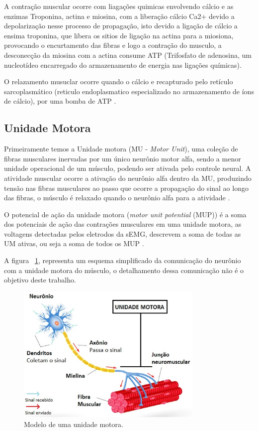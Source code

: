 A contração muscular ocorre com liagações quimicas envolvendo cálcio e as enzimas Troponina, actina e miosina, com a liberação cálcio Ca2+ devido a depolarização nesse processo de propagação, isto devido a ligação de cálcio a ensima troponina, que libera os sitios de ligação na actina para a miosiona, provocando o encurtamento das fibras e logo a contração do musculo, a desconecção da miosina com a actina consume ATP (Trifosfato de adenosina, um nucleotídeo encarregado do armazenamento de energia nas ligações químicas)\cite{da2005detecccao}. 

O relazamento musuclar ocorre quando o cálcio e recapturado pelo retículo sarcoplasmático (reticulo endoplasmatico especializado no armazenamento de íons de cálcio), por uma bomba de ATP \cite{da2005detecccao}. 

\subsection{Unidade Motora}
Primeiramente temos a Unidade motora (MU - \textit{Motor Unit}), uma coleção de fibras musculares inervadas por um único neurônio motor alfa, sendo a menor unidade operacional de um músculo, podendo ser ativada pelo controle neural. A atividade muscular ocorre a ativação do neurônio alfa dentro da MU, produzindo tensão nas fibras musculares ao passo que ocorre a propagação do sinal ao longo das fibras, o músculo é relaxado quando o neurônio alfa para a atividade \cite{yousefi2014characterizing}.

O potencial de ação da unidade motora (\textit{motor unit potential} (MUP)) é a soma dos potenciais de ação das contrações musculares em uma unidade motora, as voltagens detectadas pelos eletrodos da sEMG, descrevem a soma de todas as UM ativas, ou seja a soma de todos os MUP \cite{yousefi2014characterizing}.

A figura ~\ref{UnidadeMotora}, representa um esquema simplificado da comunicação do neurônio com a unidade motora do músculo, o detalhamento dessa comunicação não é o objetivo deste trabalho.

\begin{figure}[!htb]
   \centering
    \includegraphics[width=0.8\textwidth]{figuras/motor-neuron.eps}
    \caption{Modelo de uma unidade motora.}
    \label{UnidadeMotora}
\end{figure}

